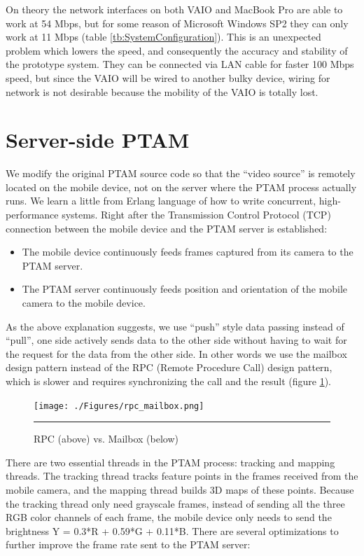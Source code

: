 On theory the network interfaces on both VAIO and MacBook Pro are able to work at 54 Mbps, but for some reason of Microsoft Windows SP2 they can only work at 11 Mbps (table \ref{tb:SystemConfiguration}). This is an unexpected problem which lowers the speed, and consequently the accuracy and stability of the prototype system. They can be connected via LAN cable for faster 100 Mbps speed, but since the VAIO will be wired to another bulky device, wiring for network is not desirable because the mobility of the VAIO is totally lost.


\section{Server-side PTAM}

We modify the original PTAM source code so that the ``video source'' is remotely located on the mobile device, not on the server where the PTAM process actually runs. We learn a little from Erlang language \cite{Reference17} of how to write concurrent, high-performance systems. Right after the Transmission Control Protocol (TCP) connection between the mobile device and the PTAM server is established:

\begin{itemize}
	\item The mobile device continuously feeds frames captured from its camera to the PTAM server.
	\item The PTAM server continuously feeds position and orientation of the mobile camera to the mobile device.
\end{itemize}

As the above explanation suggests, we use ``push'' style data passing instead of ``pull'', one side actively sends data to the other side without having to wait for the request for the data from the other side. In other words we use the mailbox design pattern instead of the RPC (Remote Procedure Call) design pattern, which is slower and requires synchronizing the call and the result (figure \ref{fig:RPCMailbox}).

\begin{figure}[htbp]
	\centering
	\texttt{[image: ./Figures/rpc\_mailbox.png]}
	\rule{35em}{0.5pt}
	\caption[RPC vs. Mailbox]{RPC (above) vs. Mailbox (below)}
	\label{fig:RPCMailbox}
\end{figure}

There are two essential threads in the PTAM process: tracking and mapping threads. The tracking thread tracks feature points in the frames received from the mobile camera, and the mapping thread builds 3D maps of these points. Because the tracking thread only need grayscale frames, instead of sending all the three RGB color channels of each frame, the mobile device only needs to send the brightness Y = 0.3*R + 0.59*G + 0.11*B. There are several optimizations to further improve the frame rate sent to the PTAM server:

